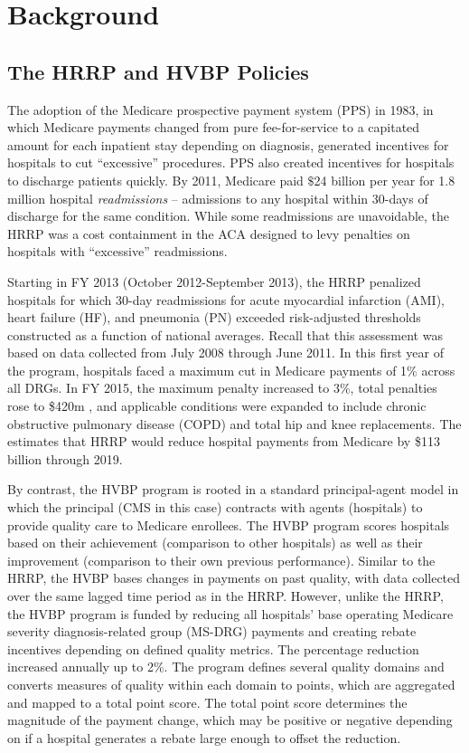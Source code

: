 \documentclass[12pt]{article}
\begin{document}
\section{Background}
\label{sec:Background}

\subsection{The HRRP and HVBP Policies}
The adoption of the Medicare prospective payment system (PPS) in 1983, in which Medicare payments changed from pure fee-for-service to a capitated amount for each inpatient stay depending on diagnosis, generated incentives for hospitals to cut ``excessive'' procedures. PPS also created incentives for hospitals to discharge patients quickly.  By 2011, Medicare paid $\$$24 billion per year for 1.8 million hospital \textit{readmissions} -- admissions to any hospital within 30-days of discharge for the same condition.  While some readmissions are unavoidable, the HRRP was a cost containment in the ACA designed to levy penalties on hospitals with ``excessive'' readmissions.

Starting in FY 2013 (October 2012-September 2013), the HRRP penalized hospitals for which 30-day readmissions for acute myocardial infarction (AMI), heart failure (HF), and pneumonia (PN) exceeded risk-adjusted thresholds constructed as a function of national averages. Recall that this assessment was based on data collected from July 2008 through June 2011. In this first year of the program, hospitals faced a maximum cut in Medicare payments of 1\% across all DRGs. In FY 2015, the maximum penalty increased to 3\%, total penalties rose to \$420m \citep{rau2015}, and applicable conditions were expanded to include chronic obstructive pulmonary disease (COPD) and total hip and knee replacements. The \cite{cbo2010} estimates that HRRP would reduce hospital payments from Medicare by \$113 billion through 2019.

By contrast, the HVBP program is rooted in a standard principal-agent model in which the principal (CMS in this case) contracts with agents (hospitals) to provide quality care to Medicare enrollees. The HVBP program scores hospitals based on their achievement (comparison to other hospitals) as well as their improvement (comparison to their own previous performance).  Similar to the HRRP, the HVBP bases changes in payments on past quality, with data collected over the same lagged time period as in the HRRP. However, unlike the HRRP, the HVBP program is funded by reducing all hospitals' base operating Medicare severity diagnosis-related group (MS-DRG) payments and creating rebate incentives depending on defined quality metrics. The percentage reduction increased annually up to 2\%. The program defines several quality domains and converts measures of quality within each domain to points, which are aggregated and mapped to a total point score.  The total point score determines the magnitude of the payment change, which may be positive or negative depending on if a hospital generates a rebate large enough to offset the reduction.
\end{document}
